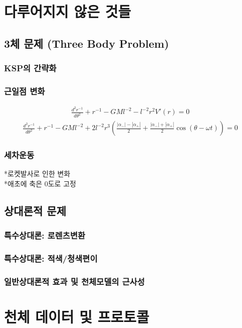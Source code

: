 \documentclass[10pt]{amsbook}
\begin{document}
\part{다루어지지 않은 것들}

\chapter{3체 문제 (Three Body Problem)}
\section{KSP의 간략화}
\section{근일점 변화}
\begin{align}
	\frac{d^2r^{-1}}{d\theta^2}+r^{-1}-GMl^{-2}-l^{-2}r^2V'(r) = 0
\end{align}
\begin{align}
	\frac{d^2r^{-1}}{d\theta^2}+r^{-1}-GMl^{-2}+2 l^{-2}r^3 \left(\frac{|\alpha_-| -|\alpha_+|}{2}+\frac{|\alpha_-| +|\alpha_+|}{2}\cos(\theta-\omega t)\right)= 0
\end{align}
\section{세차운동}
*로켓발사로 인한 변화
\\*애초에 축은 0도로 고정
\chapter{상대론적 문제}
\section{특수상대론: 로렌츠변환}
\section{특수상대론: 적색/청색편이}
\section{일반상대론적 효과 및 천체모델의 근사성}
\part{천체 데이터 및 프로토콜}
\backmatter
\backpage
\end{document}
